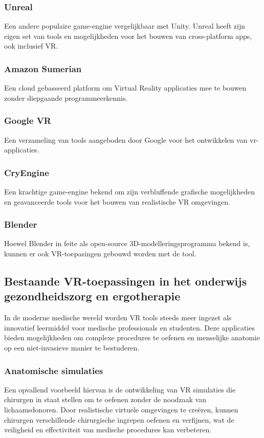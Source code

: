 \subsubsection{Unreal}
Een andere populaire game-engine vergelijkbaar met Unity. Unreal heeft zijn eigen set van tools en mogelijkheden voor het bouwen van cross-platform apps, ook inclusief VR.

\subsubsection{Amazon Sumerian}
Een cloud gebasseerd platform om Virtual Reality applicaties mee te bouwen zonder diepgaande programmeerkennis. 

\subsubsection{Google VR}
Een verzameling van tools aangeboden door Google voor het ontwikkelen van vr-applicaties.

\subsubsection{CryEngine}	
Een krachtige game-engine bekend om zijn verbluffende grafische mogelijkheden en geavanceerde tools voor het bouwen van realistische VR omgevingen.

\subsubsection{Blender}
Hoewel Blender in feite als open-source 3D-modelleringsprogramma bekend is, kunnen er ook VR-toepasingen gebouwd worden met de tool. 





\subsection{Bestaande VR-toepassingen in het onderwijs gezondheidszorg en ergotherapie}

In de moderne medische wereld worden VR tools steeds meer ingezet als innovatief leermiddel voor medische professionals en studenten. Deze applicaties bieden mogelijkheden om complexe procedures te oefenen en menselijke anatomie op een niet-invasieve manier te bestuderen. 
\subsubsection{Anatomische simulaties}
Een opvallend voorbeeld hiervan is de ontwikkeling van VR simulaties die chirurgen in staat stellen om te oefenen zonder de noodzaak van lichaamsdonoren. Door realistische virtuele omgevingen te creëren, kunnen chirurgen verschillende chirurgische ingrepen oefenen en verfijnen, wat de veiligheid en effectiviteit van medische procedures kan verbeteren. 

